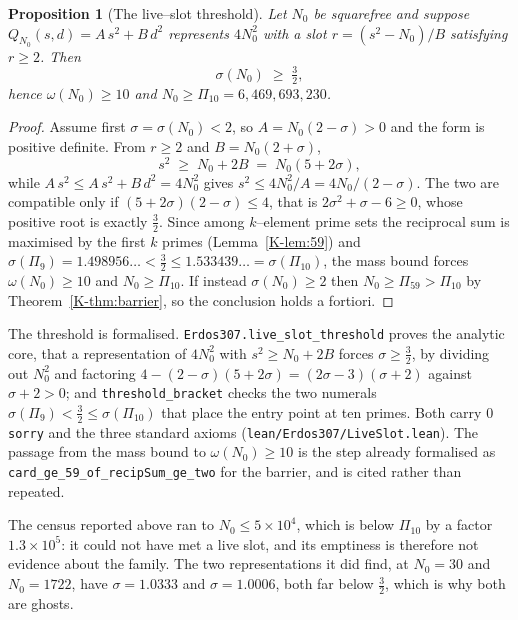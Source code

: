 \documentclass[11pt]{article}
\newtheorem{proposition}[theorem]{Proposition}
\theoremstyle{definition}
\begin{document}
\begin{proposition}[The live--slot threshold]\label{prop:liveslot}
Let $N_0$ be squarefree and suppose $Q_{N_0}(s,d)=A\,s^2+B\,d^2$ represents $4N_0^2$ with a slot
$r=(s^2-N_0)/B$ satisfying $r\ge2$. Then
\[ \sigma(N_0)\;\ge\;\tfrac32, \]
hence $\omega(N_0)\ge10$ and $N_0\ge\Pi_{10}=6{,}469{,}693{,}230$.
\end{proposition}
\begin{proof}
Assume first $\sigma=\sigma(N_0)<2$, so $A=N_0(2-\sigma)>0$ and the form is positive definite. From
$r\ge2$ and $B=N_0(2+\sigma)$,
\[ s^2\;\ge\;N_0+2B\;=\;N_0(5+2\sigma), \]
while $A\,s^2\le A\,s^2+B\,d^2=4N_0^2$ gives $s^2\le 4N_0^2/A=4N_0/(2-\sigma)$. The two are
compatible only if $(5+2\sigma)(2-\sigma)\le4$, that is $2\sigma^2+\sigma-6\ge0$, whose positive root
is exactly $\tfrac32$. Since among $k$--element prime sets the reciprocal sum is maximised by the
first $k$ primes (Lemma~\ref{K-lem:59}) and
$\sigma(\Pi_9)=1.498956\ldots<\tfrac32\le1.533439\ldots=\sigma(\Pi_{10})$, the mass bound forces
$\omega(N_0)\ge10$ and $N_0\ge\Pi_{10}$. If instead $\sigma(N_0)\ge2$ then $N_0\ge\Pi_{59}>\Pi_{10}$
by Theorem~\ref{K-thm:barrier}, so the conclusion holds a fortiori.
\end{proof}

The threshold is formalised. \texttt{Erdos307.live\_slot\_threshold} proves the analytic core, that
a representation of $4N_0^2$ with $s^2\ge N_0+2B$ forces $\sigma\ge\tfrac32$, by dividing out $N_0^2$
and factoring $4-(2-\sigma)(5+2\sigma)=(2\sigma-3)(\sigma+2)$ against $\sigma+2>0$; and
\texttt{threshold\_bracket} checks the two numerals
$\sigma(\Pi_9)<\tfrac32\le\sigma(\Pi_{10})$ that place the entry point at ten primes. Both carry $0$
\texttt{sorry} and the three standard axioms \textup{(\texttt{lean/Erdos307/LiveSlot.lean})}. The
passage from the mass bound to $\omega(N_0)\ge10$ is the step already formalised as
\texttt{card\_ge\_59\_of\_recipSum\_ge\_two} for the barrier, and is cited rather than repeated.

The census reported above ran to $N_0\le5\times10^4$, which is below $\Pi_{10}$ by a factor
$1.3\times10^5$: it could not have met a live slot, and its emptiness is therefore not evidence
about the family. The two representations it did find, at $N_0=30$ and $N_0=1722$, have
$\sigma=1.0333$ and $\sigma=1.0006$, both far below $\tfrac32$, which is why both are ghosts.
\end{document}

